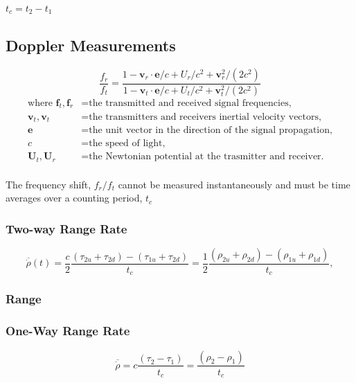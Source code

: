 $t_c = t_2 - t_1$

\subsection{Doppler Measurements}

\begin{equation}
    \frac{f_r}{f_t} = \frac{
        1-\mathbf{v}_r\cdot{}\mathbf{e}/c + U_r/c^2 +\mathbf{v}_r^2/(2c^2)
    }{
        1-\mathbf{v}_t\cdot{}\mathbf{e}/c + U_t/c^2 +\mathbf{v}_t^2/(2c^2)
    }
\end{equation}
\begin{equation*}
    \begin{aligned}
        \textrm{where  }
        \mathbf{f}_t, \mathbf{f}_r &= \textrm{the transmitted and received signal frequencies,}\\
        \mathbf{v}_t, \mathbf{v}_t &= \textrm{the transmitters and receivers inertial velocity vectors,}\\
        \mathbf{e} &= \textrm{the unit vector in the direction of the signal propagation,}\\
        c &= \textrm{the speed of light,}\\
        \mathbf{U}_t, \mathbf{U}_r &= \textrm{the Newtonian potential at the trasmitter and receiver.}\\
    \end{aligned}
\end{equation*}

The frequency shift, $f_r/f_t$ cannot be measured instantaneously and must be time averages over
a counting period, $t_c$

\subsubsection{Two-way Range Rate}
\begin{equation}
    \overline{\dot{\rho}}(t) = \frac{c}{2}\frac{(\tau_{2u}+\tau_{2d})-(\tau_{1u}+\tau_{2d})}{t_c} = \frac{1}{2}\frac{(\rho_{2u}+\rho_{2d})-(\rho_{1u} + \rho_{1d})}{t_c},
\end{equation}

\subsubsection{Range}

\subsubsection{One-Way Range Rate}
\begin{equation}
    \overline{\dot{\rho}} = c\frac{(\tau_2-\tau_1)}{t_c}=\frac{(\rho_2-\rho_1)}{t_c}
\end{equation}


